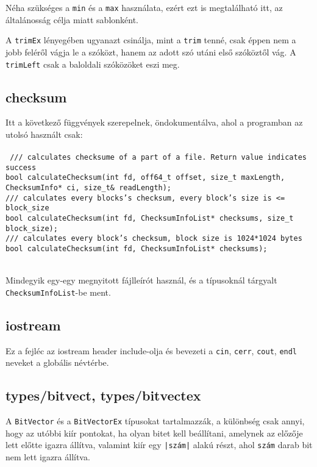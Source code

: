 \documentclass[fleqn,10pt,a4paper,titlepage]{article}
\begin{document}
  Néha szükséges a \texttt{min} és a \texttt{max} használata, ezért ezt is megtalálható itt, az általánosság célja miatt
  sablonként.
  
  A \texttt{trimEx} lényegében ugyanazt csinálja, mint a \texttt{trim} tenné, csak éppen nem a jobb feléről vágja le a
  szóközt, hanem az adott szó utáni első szóköztől vág. A \texttt{trimLeft} csak a baloldali szóközöket eszi meg.
  

  \subsection{checksum}
  Itt a következő függvények szerepelnek, öndokumentálva, ahol a programban az utolsó használt csak:\\\\
  \texttt{
    /// calculates checksume of a part of a file. Return value indicates success\\
    bool calculateChecksum(int fd, off64\_t offset, size\_t maxLength, ChecksumInfo* ci, size\_t\& readLength);\\
    /// calculates every blocks's checksum, every block's size is \textless= block\_size\\
    bool calculateChecksum(int fd, ChecksumInfoList* checksums, size\_t block\_size);\\
    /// calculates every block's checksum, block size is 1024*1024 bytes\\
    bool calculateChecksum(int fd, ChecksumInfoList* checksums);\\\\
  }

  Mindegyik egy-egy megnyitott fájlleírót használ, és a típusoknál tárgyalt \texttt{ChecksumInfoList}-be ment.

  \subsection{iostream}
  Ez a fejléc az iostream header include-olja és bevezeti a \texttt{cin}, \texttt{cerr}, \texttt{cout}, \texttt{endl}
  neveket a globális névtérbe.
  
  \subsection{types/bitvect, types/bitvectex}
  A \texttt{BitVector} és a \texttt{BitVectorEx} típusokat tartalmazzák, a különbség csak annyi, hogy az utóbbi kiír
  pontokat, ha olyan bitet kell beállítani, amelynek az előzője lett előtte igazra állítva, valamint kiír egy
  \texttt{|szám|} alakú részt, ahol \texttt{szám} darab bit nem lett igazra állítva.
  
\end{document}
